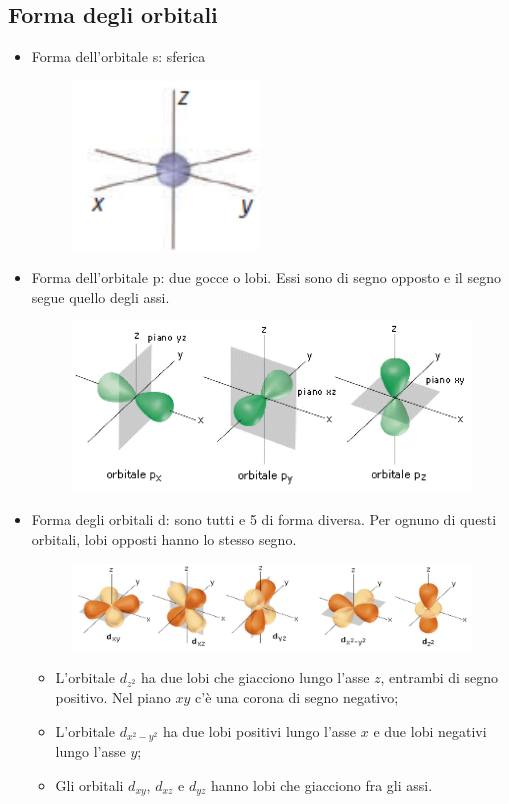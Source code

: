 \subsection{Forma degli orbitali}
\begin{itemize}
  \item Forma dell'orbitale s: sferica
  \begin{figure}[htp]
    \centering
    \includegraphics[width=5cm]{immagini/orbitale-s.png}
  \end{figure}
  \item Forma dell'orbitale p: due gocce o lobi. Essi sono di segno opposto e il segno segue quello degli assi.
  \begin{figure}[htp]
    \centering
    \includegraphics[width=12cm]{immagini/orbitale-p.png}
  \end{figure}
  \item Forma degli orbitali d: sono tutti e 5 di forma diversa. Per ognuno di questi orbitali, lobi opposti hanno lo stesso segno.
  \begin{figure}[htp]
    \centering
    \includegraphics[width=16cm]{immagini/orbitale-d.png}
  \end{figure}
  \begin{itemize}
    \item L'orbitale $d_{z^2}$ ha due lobi che giacciono lungo l'asse $z$, entrambi di segno positivo. Nel piano $xy$ c'è una corona di segno negativo;
    \item L'orbitale $d_{x^2-y^2}$ ha due lobi positivi lungo l'asse $x$ e due lobi negativi lungo l'asse $y$;
    \item Gli orbitali $d_{xy}$, $d_{xz}$ e $d_{yz}$ hanno lobi che giacciono fra gli assi.
  \end{itemize}
\end{itemize}

